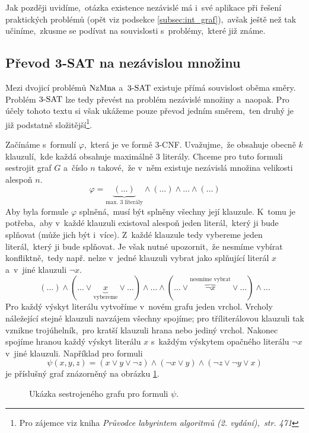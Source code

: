 Jak později uvidíme,~otázka existence nezávislé má i~své aplikace při řešení praktických problémů (opět viz podsekce \ref{subsec:int_graf}),~avšak ještě než tak učiníme,~zkusme se podívat na souvislosti s~problémy,~které již známe.

\subsection{Převod 3-SAT na nezávislou množinu}\label{subsec:prevod_3sat_nzmna}
Mezi dvojicí problémů \ensuremath{\NZMNA} a~\ensuremath{\THREESAT} existuje přímá souvislost oběma směry. Problém \ensuremath{\THREESAT} lze tedy převést na problém nezávislé množiny a~naopak. Pro účely tohoto textu si však ukážeme pouze převod jedním směrem,~ten druhý je již podstatně složitější\footnote{Pro zájemce viz kniha \emph{Průvodce labyrintem algoritmů (2. vydání),~str. 471}}.

Začínáme s~formulí $\varphi$,~která je ve formě $3$-CNF. Uvažujme,~že obsahuje obecně $k$ klauzulí,~kde každá obsahuje maximálně $3$ literály. Chceme pro tuto formuli sestrojit graf $G$ a~číslo $n$ takové,~že v~něm existuje nezávislá množina velikosti alespoň $n$.
\[\varphi=\underbrace{(\dots)}_{\text{max. 3~literály}}\land(\dots)\land\dots\land(\dots)\]
Aby byla formule $\varphi$ splněná,~musí být splněny všechny její klauzule. K~tomu je potřeba,~aby v~každé klauzuli existoval alespoň jeden literál,~který ji bude splňovat (může jich být i~více). Z~každé klauzule tedy vybereme jeden literál,~který ji bude splňovat. Je však nutné upozornit,~že nesmíme vybírat konfliktně,~tedy např. nelze v~jedné klauzuli vybrat jako splňující literál $x$ a~v~jiné klauzuli $\neg x$.
\[(\dots)\land(\dots\lor \underbrace{x}_{\text{vybereme}} \lor \dots)\land\dots\land(\dots\lor\overbrace{\neg x}^{\text{nesmíme vybrat}}\lor \dots)\land\dots\]
Pro každý výskyt literálu vytvoříme v~novém grafu jeden vrchol. Vrcholy náležející stejné klauzuli navzájem všechny spojíme; pro tříliterálovou klauzuli tak vznikne trojúhelník,~pro kratší klauzuli hrana nebo jediný vrchol. Nakonec spojíme hranou každý výskyt literálu $x$ s~každým výskytem opačného literálu $\neg x$ v~jiné klauzuli. Například pro formuli
\[\psi(x,y,z)=(x\lor y\lor \neg z)\land(\neg x\lor y)\land(\neg z\lor\neg y\lor x)\]
je příslušný graf znázorněný na obrázku \ref{fig:prevod_3sat_nzmna}.
\begin{figure}[ht]
    \centering
    
    \caption{Ukázka sestrojeného grafu pro formuli $\psi$.}
    \label{fig:prevod_3sat_nzmna}
\end{figure}

